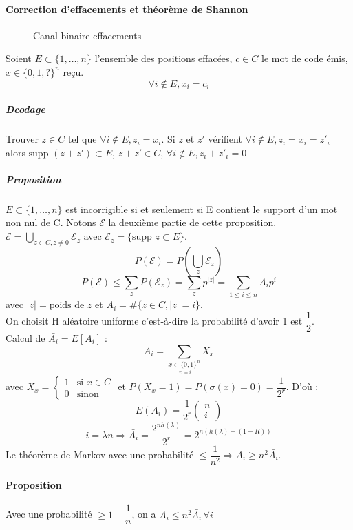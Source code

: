 \documentclass[12pt,a4paper]{report}
\begin{document}
\paragraph{Correction d'effacements et théorème de Shannon\\}
\begin{figure}[h]
	\centering
  \scalebox{0.8}{}	
  \caption{Canal binaire  effacements}
\end{figure}
Soient $E\subset\{1,\ldots,n\}$ l'ensemble des positions effacées, $c\in C$ le mot de code émis, $x\in \{0,1,?\}^n$ reçu.
$$ \forall i \not \in E, x_i = c_i $$
\subparagraph{Dcodage\\}
Trouver $z\in C$ tel que $\forall i \not \in E, z_i = x_i $. Si $z$ et $z'$ vérifient $\forall i \not \in E, z_i=x_i=z'_i $ alors
$\mbox{supp }(z+z')\subset E$, $ z+z' \in C$, $\forall i \not \in E, z_i+z'_i = 0 $
\subparagraph{Proposition\\}
$E \subset \{1,\ldots,n\}$ est incorrigible si et seulement si E contient le support d'un mot non nul de C. Notons $\mathcal{E}$ la deuxième partie de cette proposition.\\
$ \displaystyle \mathcal{E} = \bigcup_{z\in C, z\neq 0} \mathcal{E}_z $ avec $\mathcal{E}_z = \{\mbox{supp }z \subset E\}$.
$$ P(\mathcal{E}) = P\left(\bigcup_{z}\mathcal{E}_z\right)$$
$$ P(\mathcal{E})\leqslant \sum_z P(\mathcal{E}_z ) = \sum_z p^{|z|} = \sum_{1\leqslant i \leqslant n} A_i p^i $$
avec $|z|= \mbox{poids de }z$ et $A_i = \#\{z\in C, |z|=i\}$.\\
On choisit H aléatoire uniforme c'est-à-dire la probabilité d'avoir 1 est $\dfrac{1}{2}$.\\
Calcul de $\bar{A_i} = E[A_i]$ : \\
$$A_i = \sum_{\underset{|x|=i}{x \in \{0,1\}^n}} X_x $$
avec $X_x = \left\{\begin{array}{ll} 
1 & \mbox{si } x \in C \\
0 & \mbox{sinon} \end{array}\right. $ et $ P(X_x=1) = P(\sigma(x)=0) = \dfrac{1}{2^r} $.
D'où :
$$E(A_i) = \frac{1}{2^r}\left(\begin{array}{c}
n \\
i \end{array}\right) $$
$$ i=\lambda n \Longrightarrow \bar{A_i} = \frac{2^{nh(\lambda)}}{2^r} = 2^{n(h(\lambda)-(1-R))} $$
Le théorème de Markov avec une probabilité $ \leqslant \dfrac{1}{n^2} \Longrightarrow A_i \geqslant n^2 \bar{A_i} $.
\paragraph{Proposition\\}
Avec une probabilité $ \geqslant 1 - \dfrac{1}{n}$, on a $A_i \leqslant n^2 \bar{A_i} \, \forall i$\\
\end{document}
